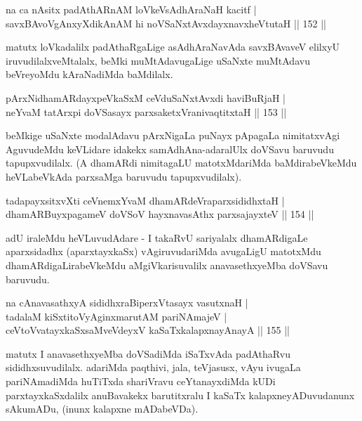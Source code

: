 \begin{shl}
na ca nAsitx padAthARnAM loVkeV\s sAdhAraNaH kacitf | \\
savxBAvoV\s gAnxyXdikAnAM hi noVSaNxtAvxdayxnavxheVtutaH \hfill||  152 ||  
\end{shl}

\begin{artha}
matutx loVkadalilx padAthaRgaLige asAdhAraNavAda savxBAvaveV elilxyU iruvudilalxveMtalalx, beMki muMtAdavugaLige uSaNxte muMtAdavu beVreyoMdu kAraNadiMda baMdilalx.
\end{artha}

\begin{shl}
pArxNidhamARdayxpeVkaSxM ceVduSaNxtAvxdi haviBuRjaH | \\
neYvaM tatArxpi doVSasayx parxsaketxVranivaqtitxtaH \hfill||  153 ||  
\end{shl}

\begin{artha}
beMkige uSaNxte modalAdavu pArxNigaLa puNayx pApagaLa nimitatxvAgi AguvudeMdu keVLidare idakekx samAdhAna-adaralUlx doVSavu baruvudu tapupxvudilalx. (A dhamARdi nimitagaLU matotxMdariMda baMdirabeVkeMdu heVLabeVkAda parxsaMga baruvudu tapupxvudilalx).
\end{artha}

\begin{shl}
tadapayxsitxvXti ceVnemxYvaM dhamARdeVraparxsididhxtaH | \\
dhamARBuyxpagameV doVSoV hayxnavasAthx parxsajayxteV \hfill||  154 ||  
\end{shl}

\begin{artha}
adU iraleMdu heVLuvudAdare - I takaRvU sariyalalx dhamARdigaLe aparxsidadhx (aparxtayxkaSx) vAgiruvudariMda avugaLigU matotxMdu dhamARdigaLirabeVkeMdu aMgiVkarisuvalilx anavasethxyeMba doVSavu baruvudu.
\end{artha}

\begin{shl}
na cAnavasathxyA sididhxraBiperxVtasayx vasutxnaH | \\
tadalaM kiSxtitoVyAginxmarutAM pariNAmajeV | \\
ceVtoVvatayxkaSxsaMveVdeyxV kaSaTxkalapxnayA\s nayA \hfill||  155 ||  
\end{shl}	

\begin{artha}
matutx I anavasethxyeMba doVSadiMda iSaTxvAda padAthaRvu sididhxsuvudilalx. adariMda paqthivi, jala, teVjasusx, vAyu ivugaLa pariNAmadiMda huTiTxda shariVravu ceYtanayxdiMda kUDi parxtayxkaSxdalilx anuBavakekx barutitxralu I kaSaTx kalapxneyADuvudanunx sAkumADu, (inunx kalapxne mADabeVDa).
\end{artha}

